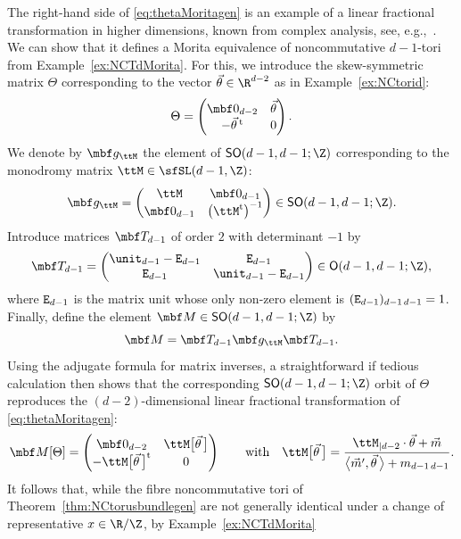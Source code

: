 \begin{Remark}
\label{rem:MoritaKK}
The right-hand side of \eqref{eq:thetaMoritagen} is an example of a
linear fractional transformation in higher dimensions, known from
complex analysis, see, e.g.,~\cite{Cowen2000}. We can show that it defines a Morita equivalence of noncommutative $d{-}1$-tori from
Example~\ref{ex:NCTdMorita}. For this, we introduce the skew-symmetric
matrix $\Theta$ corresponding to the vector $\vec\theta\in\R^{d-2}$ as
in Example~\ref{ex:NCtorid}:
\[
\Theta = \left(
\begin{matrix}
\mbf 0_{d-2} & \vec\theta \\ -\vec\theta\,^{\rm t} & 0
\end{matrix}
\right) .
\]
We denote by $\mbf g_{\ttM}$ the element of ${\sf SO}(d-1,d-1;\Z)$
corresponding to the monodromy matrix $\ttM\in\sfSL(d-1,\Z)$:
\[
\mbf g_{\ttM} = \left(
\begin{matrix}
\ttM & \mbf 0_{d-1} \\ \mbf 0_{d-1} & \big(\ttM^{\rm t}\big)^{-1}
\end{matrix}
\right)
\in {\sf SO}(d-1,d-1;\Z) .
\]
Introduce matrices $\mbf T_{d-1}$ of order $2$ with determinant $-1$
by
\[
\mbf T_{d-1} = \left(
\begin{matrix}
\unit_{d-1}-{\tt E}_{d-1} & {\tt E}_{d-1} \\ {\tt E}_{d-1} &
\unit_{d-1}-{\tt E}_{d-1}
\end{matrix}
\right) \in {\sf O}(d-1,d-1;\Z) ,
\]
where ${\tt E}_{d-1}$ is the matrix unit whose only
non-zero element is $({\tt E}_{d-1})_{d-1\,d-1} = 1$.
Finally, define the element $\mbf M\in{\sf SO}(d-1,d-1;\Z)$ by
\[
\mbf M = \mbf T_{d-1} \mbf g_{\ttM} \mbf T_{d-1} .
\]
Using the adjugate formula
for matrix inverses, a straightforward if tedious calculation then shows that the
corresponding ${\sf SO}(d-1,d-1;\Z)$ orbit of $\Theta$ reproduces the
$(d{-}2)$-dimensional linear fractional transformation of
\eqref{eq:thetaMoritagen}:
\[
\mbf M[\Theta] = \left(
\begin{matrix}
\mbf 0_{d-2} & \ttM\big[\vec\theta\, \big] \\
-\ttM\big[\vec\theta\, \big]^{\rm t} & 0
\end{matrix}
\right) \qquad \mbox{with} \quad \ttM\big[\vec\theta\, \big] = \frac{\ttM_{|d-2}\cdot\vec\theta + \vec m}
{\big\langle \vec m',\vec\theta\, \big\rangle + m_{d-1 \,
 d-1}} .
\]
It follows that, while the fibre noncommutative
tori of Theorem~\ref{thm:NCtorusbundlegen} are not generally identical under a change of
representative $x\in\R/\Z$, by Example~\ref{ex:NCTdMorita}

\end{Remark}

